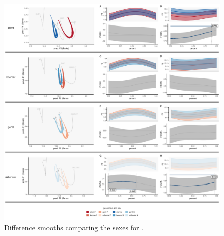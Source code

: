\begin{figure}[p]
    \centering
    \includegraphics[width=\textwidth]{Figures/BOT/BOT_sex_panel_plot.pdf}
    \caption{Difference smooths comparing the sexes for \lot.}
    \label{fig:bot_diff_smooths_sex_gen}
\end{figure}




